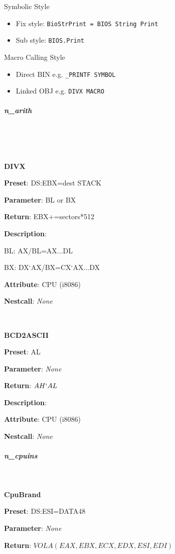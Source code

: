 Symbolic Style

\begin{itemize}

\item Fix style: \verb|BioStrPrint = BIOS String Print|
\item Sub style: \verb|BIOS.Print|
\end{itemize}

Macro Calling Style

\begin{itemize}

\item Direct BIN e.g. \verb|_PRINTF SYMBOL|
\item Linked OBJ e.g. \verb|DIVX MACRO|
\end{itemize}



\subparagraph{n\_arith} \



 \

\textbf{DIVX}

\textbf{Preset}: DS:EBX=dest STACK

\textbf{Parameter}: BL or BX

\textbf{Return}: EBX+=sectors*512

\textbf{Description}:

BL: AX/BL=AX...DL

BX: DX`AX/BX=CX`AX...DX

\textbf{Attribute}: CPU (i8086)

\textbf{Nestcall}: \textit{None}



 \

\textbf{BCD2ASCII}

\textbf{Preset}: AL

\textbf{Parameter}: \textit{None}

\textbf{Return}: $AH`AL$

\textbf{Description}:

\textbf{Attribute}: CPU (i8086)

\textbf{Nestcall}: \textit{None}



\subparagraph{n\_cpuins} \

\textbf{CpuBrand}

\textbf{Preset}: DS:ESI=DATA48

\textbf{Parameter}: \textit{None}

\textbf{Return}: $VOLA(EAX,EBX,ECX,EDX,ESI,EDI)$

